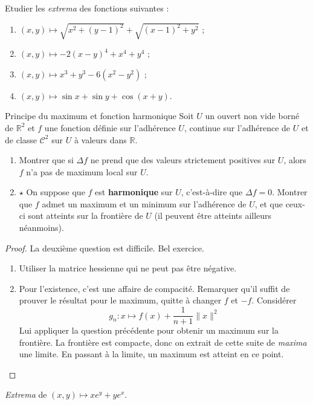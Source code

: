 \documentclass[french,a4paper]{article}
\newcommand{\R}{\mathbb{R}}
\theoremstyle{plain}
\theoremstyle{definition}
\theoremstyle{remark}
\begin{document}
\begin{ex}[Moulin.CD.33]{}
	Etudier les \textit{extrema} des fonctions suivantes :
	\begin{enumerate}
		\item $(x,y)\mapsto\sqrt{x^2+(y-1)^2}+\sqrt{(x-1)^2+y^2}$ ;
		\item $(x,y)\mapsto -2(x-y)^4+x^4+y^4$ ;
		\item $(x,y)\mapsto x^3+y^3-6(x^2-y^2)$ ;
		\item $(x,y)\mapsto \sin x+\sin y+\cos(x+y)$.
	\end{enumerate}
\end{ex}

\begin{ex}[Moulin.CD.34]{Principe du maximum et fonction harmonique}
	Soit $U$ un ouvert non vide borné de $\R^2$ et $f$ une fonction définie sur l'adhérence $U$, continue sur l'adhérence de $U$ et de classe $\mathcal{C}^2$ sur $U$ à valeurs dans $\R$.
	\begin{enumerate}
		\item Montrer que si $\Delta f$ ne prend que des valeurs strictement positives sur $U$, alors $f$ n'a pas de maximum local sur $U$.
		\item $\star$ On suppose que $f$ est \textbf{harmonique} sur $U$, c'est-à-dire que $\Delta f=0$. Montrer que $f$ admet un maximum et un minimum sur l'adhérence de $U$, et que ceux-ci sont atteints sur la frontière de $U$ (il peuvent être atteints ailleurs néanmoins).
	\end{enumerate}
\end{ex}
\begin{proof}
	La deuxième question est difficile. Bel exercice.
	\begin{enumerate}
		\item Utiliser la matrice hessienne qui ne peut pas être négative.
		\item Pour l'existence, c'est une affaire de compacité. Remarquer qu'il suffit de prouver le résultat pour le maximum, quitte à changer $f$ et $-f$. Considérer $$g_n:x\mapsto f(x)+\frac{1}{n+1}\lVert x\rVert^2$$ Lui appliquer la question précédente pour obtenir un maximum sur la frontière. La frontière est compacte, donc on extrait de cette suite de \textit{maxima} une limite. En passant à la limite, un maximum est atteint en ce point.
	\end{enumerate}
\end{proof}

\begin{ex}[Moulin.CD.35]{}
	\textit{Extrema} de $(x,y)\mapsto xe^y+ye^x$.
\end{ex}
\end{document}
